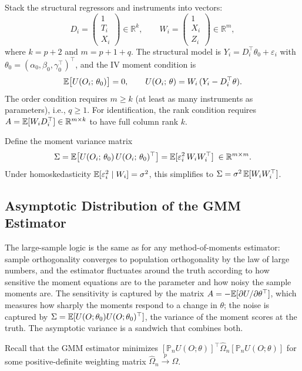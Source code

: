 \documentclass[master.tex]{subfiles}
\begin{document}
Stack the structural regressors and instruments into vectors:
\[
  D_i = \begin{pmatrix} 1 \\ T_i \\ X_i \end{pmatrix} \in \mathbb{R}^k,
  \qquad
  W_i = \begin{pmatrix} 1 \\ X_i \\ Z_i \end{pmatrix} \in \mathbb{R}^m,
\]
where $k = p + 2$ and $m = p + 1 + q$.  The structural model is
$Y_i = D_i^\top\theta_0 + \varepsilon_i$ with
$\theta_0 = (\alpha_0, \beta_0, \gamma_0^\top)^\top$, and the IV
moment condition is
\[
  \mathbb{E}\bigl[U(O_i;\,\theta_0)\bigr] = 0,
  \qquad
  U(O_i;\,\theta) = W_i\,(Y_i - D_i^\top\theta).
\]
The order condition requires $m \geq k$ (at least as many instruments
as parameters), i.e., $q \geq 1$.  For identification, the rank
condition requires $A = \mathbb{E}[W_i D_i^\top] \in \mathbb{R}^{m \times k}$
to have full column rank $k$.

Define the moment variance matrix
\[
  \Sigma = \mathbb{E}\bigl[U(O_i;\,\theta_0)\,U(O_i;\,\theta_0)^\top\bigr]
         = \mathbb{E}[\varepsilon_i^2\, W_i W_i^\top]
         \;\in \mathbb{R}^{m \times m}.
\]
Under homoskedasticity $\mathbb{E}[\varepsilon_i^2 \mid W_i] = \sigma^2$,
this simplifies to $\Sigma = \sigma^2\,\mathbb{E}[W_i W_i^\top]$.

\subsection{Asymptotic Distribution of the GMM Estimator}

The large-sample logic is the same as for any method-of-moments
estimator: sample orthogonality converges to population orthogonality
by the law of large numbers, and the estimator fluctuates around the
truth according to how sensitive the moment equations are to the
parameter and how noisy the sample moments are.  The sensitivity is
captured by the matrix $A = -\mathbb{E}[\partial U/\partial\theta^\top]$,
which measures how sharply the moments respond to a change in
$\theta$; the noise is captured by $\Sigma = \mathbb{E}[U(O;\theta_0)
U(O;\theta_0)^\top]$, the variance of the moment scores at the truth.
The asymptotic variance is a sandwich that combines both.

Recall that the GMM estimator minimizes
$[\mathbb{P}_n U(O;\theta)]^\top \hat\Omega_n [\mathbb{P}_n U(O;\theta)]$
for some positive-definite weighting matrix $\hat\Omega_n
\xrightarrow{p} \Omega$.
\end{document}
